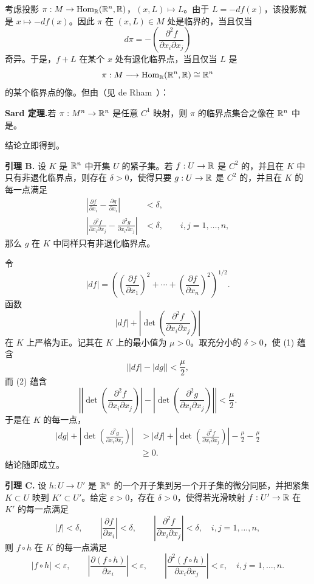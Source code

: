 考虑投影 $\pi:M\to\operatorname{Hom}_{\mathbb{R}}(\mathbb{R}^n,\mathbb{R})$，$(x,L)\mapsto L$。由于 $L=-df(x)$，该投影就是 $x\mapsto-df(x)$。因此 $\pi$ 在 $(x,L)\in M$ 处是临界的，当且仅当
\[
  d\pi=-\left(\frac{\partial^2f}{\partial x_i\partial x_j}\right)
\]
奇异。于是，$f+L$ 在某个 $x$ 处有退化临界点，当且仅当 $L$ 是
\[
  \pi:M\longrightarrow\operatorname{Hom}_{\mathbb{R}}(\mathbb{R}^n,\mathbb{R})\cong\mathbb{R}^n
\]
的某个临界点的像。但由（见 de Rham~\cite[p.~10]{ref01}）：

\par\smallskip\noindent\textbf{Sard 定理.}\quad 若 $\pi:M^n\to\mathbb{R}^n$ 是任意 $C^1$ 映射，则 $\pi$ 的临界点集合之像在 $\mathbb{R}^n$ 中是。

结论立即得到。
\EndProof

\par\medskip\noindent{}\label{lem:2-B}\textbf{引理 B.}\quad
设 $K$ 是 $\mathbb{R}^n$ 中开集 $U$ 的紧子集。若 $f:U\to\mathbb{R}$ 是 $C^2$ 的，并且在 $K$ 中只有非退化临界点，则存在 $\delta>0$，使得只要 $g:U\to\mathbb{R}$ 是 $C^2$ 的，并且在 $K$ 的每一点满足
\begin{align}
  \left|\frac{\partial f}{\partial x_i}-\frac{\partial g}{\partial x_i}\right|&<\delta, \tag{1}\\
  \left|\frac{\partial^2f}{\partial x_i\partial x_j}
  -\frac{\partial^2g}{\partial x_i\partial x_j}\right|&<\delta,
  \qquad i,j=1,\ldots,n, \tag{2}
\end{align}
那么 $g$ 在 $K$ 中同样只有非退化临界点。

\Proof 令
\[
  |df|=\left(\left(\frac{\partial f}{\partial x_1}\right)^2+
  \cdots+\left(\frac{\partial f}{\partial x_n}\right)^2\right)^{1/2}.
\]
函数
\[
  |df|+\left|\det\left(\frac{\partial^2f}{\partial x_i\partial x_j}\right)\right|
\]
在 $K$ 上严格为正。记其在 $K$ 上的最小值为 $\mu>0$。取充分小的 $\delta>0$，使 (1) 蕴含
\[
  \bigl||df|-|dg|\bigr|<\frac\mu2,
\]
而 (2) 蕴含
\[
\left|
 \left|\det\left(\frac{\partial^2f}{\partial x_i\partial x_j}\right)\right|
 -\left|\det\left(\frac{\partial^2g}{\partial x_i\partial x_j}\right)\right|
\right|<\frac\mu2.
\]
于是在 $K$ 的每一点，
\begin{align*}
 |dg|+\left|\det\left(\frac{\partial^2g}{\partial x_i\partial x_j}\right)\right|
 &>|df|+\left|\det\left(\frac{\partial^2f}{\partial x_i\partial x_j}\right)\right|-\frac\mu2-\frac\mu2\\
 &\geq0.
\end{align*}
结论随即成立。
\EndProof

\par\medskip\noindent{}\label{lem:2-C}\textbf{引理 C.}\quad
设 $h:U\to U'$ 是 $\mathbb{R}^n$ 的一个开子集到另一个开子集的微分同胚，并把紧集 $K\subset U$ 映到 $K'\subset U'$。给定 $\varepsilon>0$，存在 $\delta>0$，使得若光滑映射 $f:U'\to\mathbb{R}$ 在 $K'$ 的每一点满足
\[
 |f|<\delta,\qquad
 \left|\frac{\partial f}{\partial x_i}\right|<\delta,\qquad
 \left|\frac{\partial^2f}{\partial x_i\partial x_j}\right|<\delta,
 \quad i,j=1,\ldots,n,
\]
则 $f\circ h$ 在 $K$ 的每一点满足
\[
 |f\circ h|<\varepsilon,\qquad
 \left|\frac{\partial(f\circ h)}{\partial x_i}\right|<\varepsilon,\qquad
 \left|\frac{\partial^2(f\circ h)}{\partial x_i\partial x_j}\right|<\varepsilon,
 \quad i,j=1,\ldots,n.
\]

